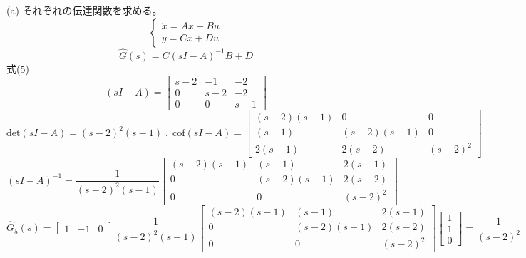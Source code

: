 \documentclass{jsarticle}
\begin{document}
(a) それぞれの伝達関数を求める。
\begin{equation}
  \left\{\begin{array} { l } 
  { \dot { x } = A x + B u  } \\
  { y = C x + D u }
  \end{array} 
  \right.
  \end{equation}
\begin{equation}
  \hat{G}(s) = C(sI-A)^{-1}B+D\tag{4.3}
\end{equation}
式(5)\;\;
\begin{equation}
  (sI-A) = \begin{bmatrix}
    s-2& -1& -2\\
    0  &s-2& -2\\
    0  & 0 &s-1
  \end{bmatrix}
\end{equation}
\begin{equation}
  \text{det}(sI-A) = (s-2)^2(s-1)
\;,\;
  \text{cof}(sI-A) = \begin{bmatrix}
    (s-2)(s-1)& 0 & 0\\
    (s-1)&(s-2)(s-1)& 0\\
    2(s-1) &2(s-2)&(s-2)^2
  \end{bmatrix}
\end{equation}
\begin{equation}
  {(sI-A)}^{-1} = \frac{1}{(s-2)^2(s-1)}
  \begin{bmatrix}
    (s-2)(s-1)& (s-1) & 2(s-1)\\
    0&(s-2)(s-1)& 2(s-2)\\
    0 &0&(s-2)^2
  \end{bmatrix}
\end{equation}
\begin{equation}
  \hat{G}_5(s) = 
  \begin{bmatrix}
    1&-1&0
  \end{bmatrix}
  \frac{1}{(s-2)^2(s-1)}
  \begin{bmatrix}
    (s-2)(s-1)& (s-1) & 2(s-1)\\
    0&(s-2)(s-1)& 2(s-2)\\
    0 &0&(s-2)^2
  \end{bmatrix}
  \begin{bmatrix}
    1\\1\\0
  \end{bmatrix}
  = \frac{1}{(s-2)^2}
\end{equation}
\end{document}
